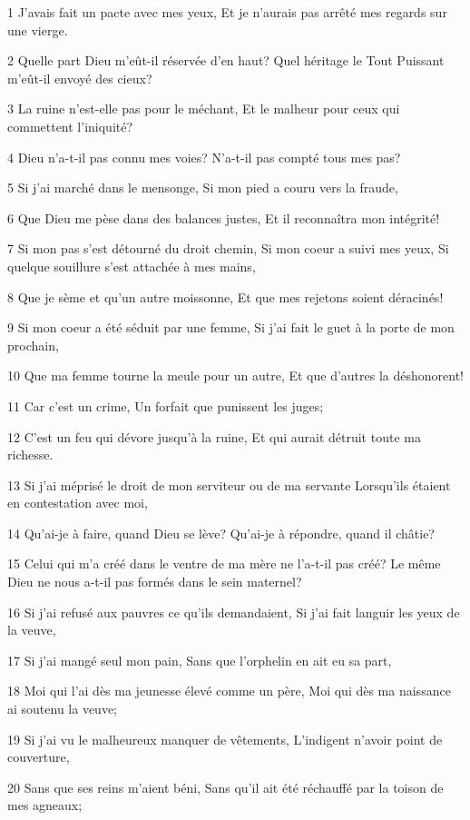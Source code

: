 \par 1 J'avais fait un pacte avec mes yeux, Et je n'aurais pas arrêté mes regards sur une vierge.
\par 2 Quelle part Dieu m'eût-il réservée d'en haut? Quel héritage le Tout Puissant m'eût-il envoyé des cieux?
\par 3 La ruine n'est-elle pas pour le méchant, Et le malheur pour ceux qui commettent l'iniquité?
\par 4 Dieu n'a-t-il pas connu mes voies? N'a-t-il pas compté tous mes pas?
\par 5 Si j'ai marché dans le mensonge, Si mon pied a couru vers la fraude,
\par 6 Que Dieu me pèse dans des balances justes, Et il reconnaîtra mon intégrité!
\par 7 Si mon pas s'est détourné du droit chemin, Si mon coeur a suivi mes yeux, Si quelque souillure s'est attachée à mes mains,
\par 8 Que je sème et qu'un autre moissonne, Et que mes rejetons soient déracinés!
\par 9 Si mon coeur a été séduit par une femme, Si j'ai fait le guet à la porte de mon prochain,
\par 10 Que ma femme tourne la meule pour un autre, Et que d'autres la déshonorent!
\par 11 Car c'est un crime, Un forfait que punissent les juges;
\par 12 C'est un feu qui dévore jusqu'à la ruine, Et qui aurait détruit toute ma richesse.
\par 13 Si j'ai méprisé le droit de mon serviteur ou de ma servante Lorsqu'ils étaient en contestation avec moi,
\par 14 Qu'ai-je à faire, quand Dieu se lève? Qu'ai-je à répondre, quand il châtie?
\par 15 Celui qui m'a créé dans le ventre de ma mère ne l'a-t-il pas créé? Le même Dieu ne nous a-t-il pas formés dans le sein maternel?
\par 16 Si j'ai refusé aux pauvres ce qu'ils demandaient, Si j'ai fait languir les yeux de la veuve,
\par 17 Si j'ai mangé seul mon pain, Sans que l'orphelin en ait eu sa part,
\par 18 Moi qui l'ai dès ma jeunesse élevé comme un père, Moi qui dès ma naissance ai soutenu la veuve;
\par 19 Si j'ai vu le malheureux manquer de vêtements, L'indigent n'avoir point de couverture,
\par 20 Sans que ses reins m'aient béni, Sans qu'il ait été réchauffé par la toison de mes agneaux;
